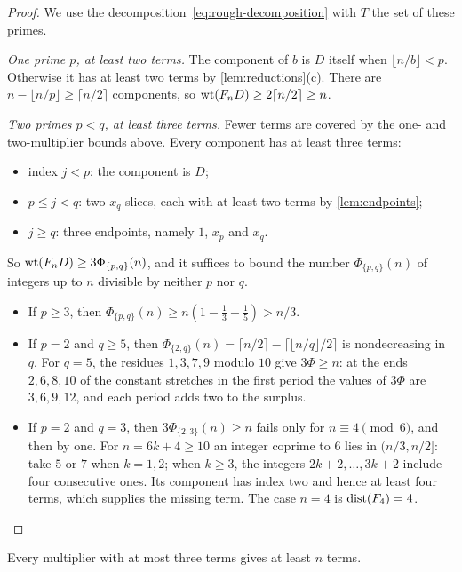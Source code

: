\begin{proof}
We use the decomposition~\eqref{eq:rough-decomposition} with $T$ the set of these primes.

\emph{One prime $p$, at least two terms.} The component of $b$ is $D$ itself when $\lfloor n/b\rfloor<p$. Otherwise it has at least two terms by \cref{lem:reductions}(c). There are $n-\lfloor n/p\rfloor\ge\lceil n/2\rceil$ components, so $\operatorname{wt}(F_nD)\ge2\lceil n/2\rceil\ge n$.

\emph{Two primes $p<q$, at least three terms.} Fewer terms are covered by the one- and two-multiplier bounds above. Every component has at least three terms:
\begin{itemize}
\item index $j<p$: the component is $D$;
\item $p\le j<q$: two $x_q$-slices, each with at least two terms by \cref{lem:endpoints};
\item $j\ge q$: three endpoints, namely $1$, $x_p$ and $x_q$.
\end{itemize}
So $\operatorname{wt}(F_nD)\ge3\Phi_{\{p,q\}}(n)$, and it suffices to bound the number $\Phi_{\{p,q\}}(n)$ of integers up to $n$ divisible by neither $p$ nor $q$.
\begin{itemize}
\item If $p\ge3$, then $\Phi_{\{p,q\}}(n)\ge n(1-\frac13-\frac15)>n/3$.
\item If $p=2$ and $q\ge5$, then $\Phi_{\{2,q\}}(n)=\lceil n/2\rceil-\lceil\lfloor n/q\rfloor/2\rceil$ is nondecreasing in $q$. For $q=5$, the residues $1,3,7,9$ modulo $10$ give $3\Phi\ge n$: at the ends $2,6,8,10$ of the constant stretches in the first period the values of $3\Phi$ are $3,6,9,12$, and each period adds two to the surplus.
\item If $p=2$ and $q=3$, then $3\Phi_{\{2,3\}}(n)\ge n$ fails only for $n\equiv4\pmod6$, and then by one. For $n=6k+4\ge10$ an integer coprime to $6$ lies in $(n/3,n/2]$: take $5$ or $7$ when $k=1,2$; when $k\ge3$, the integers $2k+2,\dots,3k+2$ include four consecutive ones. Its component has index two and hence at least four terms, which supplies the missing term. The case $n=4$ is $\operatorname{dist}(F_4)=4$.
\end{itemize}
\end{proof}

\begin{corollary}\label{cor:three-lists}
Every multiplier with at most three terms gives at least $n$ terms.
\end{corollary}

